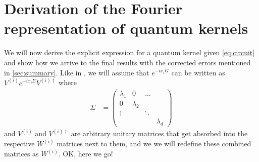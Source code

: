 \documentclass{article}
\begin{document}
\section{Derivation of the Fourier representation of quantum kernels}
We will now derive the explicit expression for a quantum kernel given \autoref{eq:circuit} and show how we arrive to the final results with the corrected errors mentioned in \autoref{sec:summary}. Like in \cite{maria}, we will assume that $e^{-ix_iG}$ can be written as $V^{(i)}e^{-ix_i\Sigma}V^{(i)\dagger}$ where
\begin{align}
	\Sigma &= 	\begin{pmatrix}
		\lambda_1 & 0 & \ldots\\ 
		0 & \lambda_2  \\ 
		\vdots  & & \ddots\\
		& & & \lambda_d
	\end{pmatrix}
\end{align}
and $V^{(i)}$ and $V^{(i)\dagger}$ are arbitrary unitary matrices that get absorbed into the respective $W^{(i)}$ matrices next to them, and we we will redefine these combined matrices as $W^{(i)}$. OK, here we go!
\end{document}
